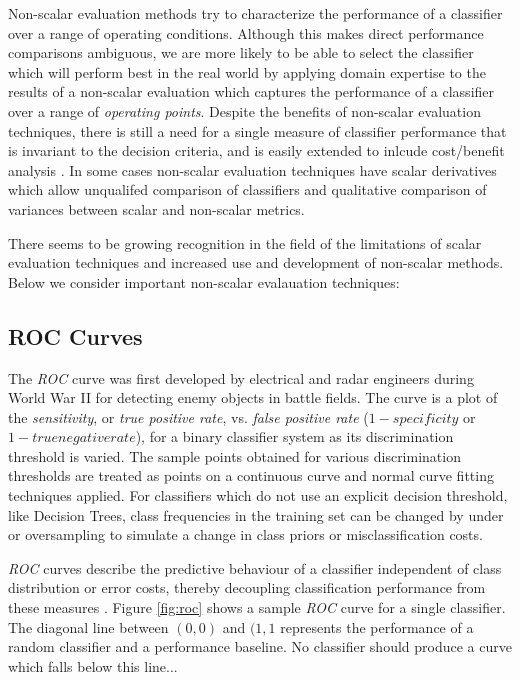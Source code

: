 \documentclass[10pt]{unbthesis}
\begin{document}
Non-scalar evaluation methods try to characterize the performance of a
classifier over a range of operating conditions. Although this makes
direct performance comparisons ambiguous, we are more likely to be
able to select the classifier which will perform best in the real
world by applying domain expertise to the results of a non-scalar
evaluation which captures the performance of a classifier over a range
of \textit{operating points}. Despite the benefits of non-scalar
evaluation techniques, there is still a need for a single measure of
classifier performance that is invariant to the decision criteria, and
is easily extended to inlcude cost/benefit analysis
\cite{Refworks:32}. In some cases non-scalar evaluation techniques
have scalar derivatives which allow unqualifed comparison of
classifiers and qualitative comparison of variances between scalar and
non-scalar metrics.

There seems to be growing recognition in the field of the limitations
of scalar evaluation techniques and increased use and development of
non-scalar methods. Below we consider important non-scalar evalauation
techniques:

\subsection*{ROC Curves}
The \textit{ROC} curve was first developed by electrical and radar
engineers during World War II for detecting enemy objects in battle
fields. The curve is a plot of the \textit{sensitivity}, or
\textit{true positive rate}, vs. \textit{false positive rate} (\(1 −
specificity\) or \(1 - true negative rate\)), for a binary classifier
system as its discrimination threshold is varied. The sample points
obtained for various discrimination thresholds are treated as points
on a continuous curve and normal curve fitting techniques applied. 
For classifiers which do not use an explicit decision threshold, like
Decision Trees, class frequencies in the training set can be changed
by under or oversampling to simulate a change in class priors or
misclassification costs. 

\textit{ROC} curves describe the predictive
behaviour of a classifier independent of class distribution or error
costs, thereby decoupling classification performance from these
measures \cite{Refworks:45}. Figure \ref{fig:roc} shows a sample
\textit{ROC} curve for a single classifier. The diagonal line between
\((0,0)\) and \((1,1\) represents the performance of a random
classifier and a performance baseline. No classifier should produce a
curve which falls below this line...
\end{document}

